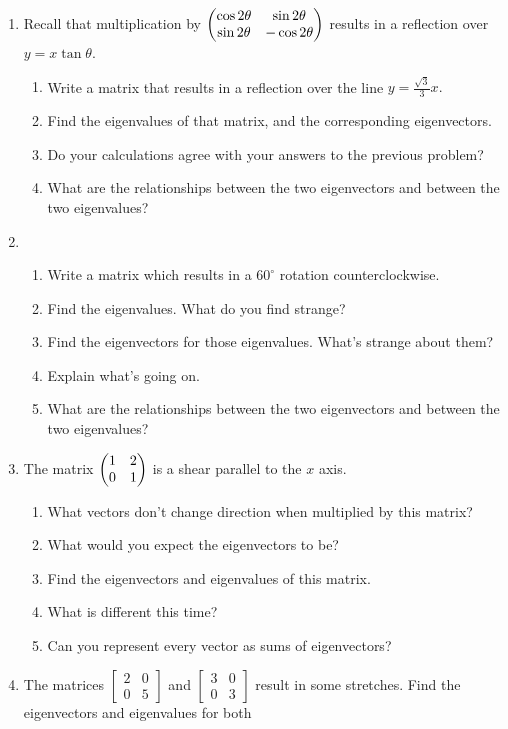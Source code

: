 \documentclass[../gatm_answers.tex]{subfiles}
\begin{document}
\begin{enumerate}
\begin{enumerate}
\end{enumerate}
\item Recall that multiplication by $\begin{pmatrix} \cos 2\theta & \sin 2\theta \\ \sin 2\theta & -\cos 2\theta \end{pmatrix}$ results in a reflection over $y=x\tan \theta$.
\begin{enumerate}
\item Write a matrix that results in a reflection over the line $y=\frac{\sqrt{3}}{3}x.$
\item Find the eigenvalues of that matrix, and the corresponding eigenvectors.
\item Do your calculations agree with your answers to the previous problem?
\item What are the relationships between the two eigenvectors and between the two eigenvalues?
\end{enumerate}
\item \begin{enumerate}
\item Write a matrix which results in a $60^\circ$ rotation counterclockwise.
\item Find the eigenvalues. What do you find strange?
\item Find the eigenvectors for those eigenvalues. What's strange about them?
\item Explain what's going on.
\item What are the relationships between the two eigenvectors and between the two eigenvalues?
\end{enumerate}
\item The matrix $\begin{pmatrix} 1 & 2 \\ 0 & 1 \end{pmatrix}$ is a shear parallel to the $x$ axis.
\begin{enumerate}
\item What vectors don't change direction when multiplied by this matrix?
\item What would you expect the eigenvectors to be?
\item Find the eigenvectors and eigenvalues of this matrix.
\item What is different this time?
\item Can you represent every vector as sums of eigenvectors?
\end{enumerate}
\item The matrices $\left[\begin{smallmatrix} 2 & 0 \\ 0 & 5 \end{smallmatrix}\right]$ and $\left[\begin{smallmatrix} 3 & 0 \\ 0 & 3 \end{smallmatrix}\right]$ result in some stretches. Find the eigenvectors and eigenvalues for both

\end{enumerate}
\end{document}
